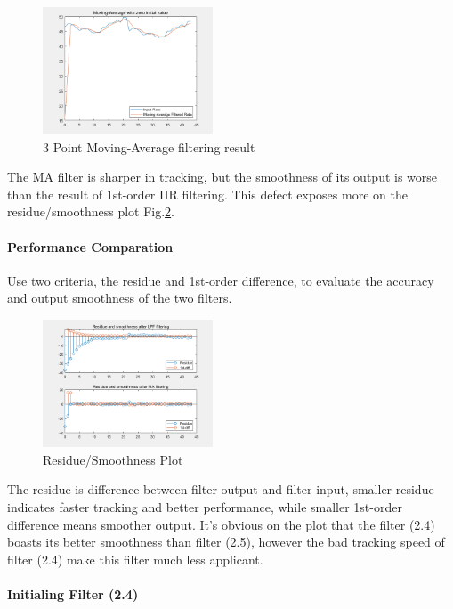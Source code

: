 \documentclass[conference]{IEEEtran}
\begin{document}
\begin{figure}[htpb]
	\centering
	\includegraphics[width=0.45\textwidth]{../matlab/q28_2.png}
	\caption{3 Point Moving-Average filtering result}
	\label{fig:q282}
\end{figure}

The MA filter is sharper in tracking, but the smoothness of its output is worse than the result of 1st-order IIR filtering. This defect exposes more on the residue/smoothness plot Fig.\ref{fig:q283_rsp}.

\paragraph{Performance Comparation}
Use two criteria, the residue and 1st-order difference, to evaluate the accuracy and output smoothness of the two filters.
\begin{figure}[htpb]
	\centering
	\includegraphics[width=0.45\textwidth]{../matlab/q28_3.png}
	\caption{Residue/Smoothness Plot}
	\label{fig:q283_rsp}
\end{figure}

The residue is difference between filter output and filter input, smaller residue indicates faster tracking and better performance, while smaller 1st-order difference means smoother output. It's obvious on the plot that the filter (2.4) boasts its better smoothness than filter (2.5), however the bad tracking speed of filter (2.4) make this filter much less applicant.

\paragraph{Initialing Filter (2.4)}
\end{document}
